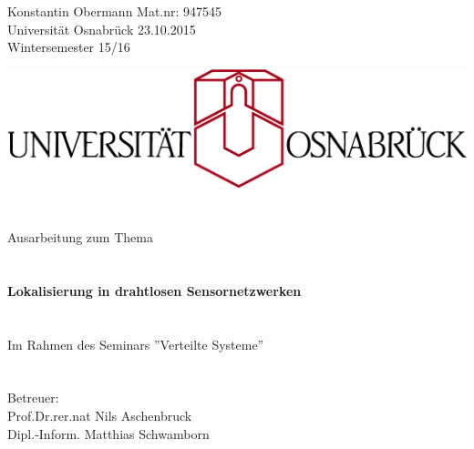 \documentclass[12pt, a4wide]{scrreprt}
\begin{document}
\noindent
Konstantin Obermann \hfill Mat.nr: 947545\\
Universität Osnabrück \hfill 23.10.2015\\
Wintersemester 15/16\\
\thispagestyle{empty}
\begin{center}
\includegraphics[scale=.9]{uos_proper.png}
\section*{}
{\LARGE Ausarbeitung zum Thema}\\
\section*{}
{\Huge {\bf Lokalisierung in drahtlosen Sensornetzwerken}}\\
\section*{}
{\Large Im Rahmen des Seminars ''Verteilte Systeme''}\\
\section*{}
{\Large Betreuer:}\\
{\Large Prof.Dr.rer.nat Nils Aschenbruck}\\
{\Large Dipl.-Inform. Matthias Schwamborn}\\
\end{center}

\tableofcontents
{}

\end{document}
